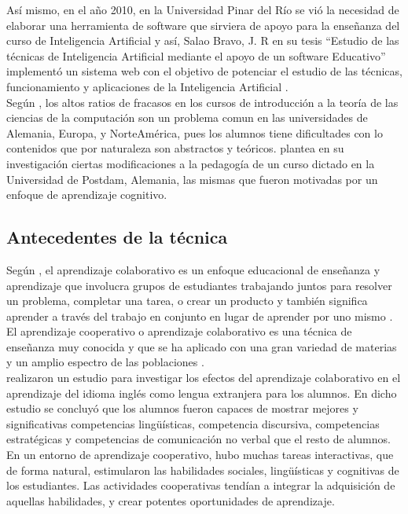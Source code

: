 Así mismo, en el año 2010, en la Universidad Pinar del Río se vió la necesidad de elaborar una herramienta de software que sirviera de apoyo para la enseñanza del curso de Inteligencia Artificial y así, Salao Bravo, J. R en su tesis “Estudio de las técnicas de Inteligencia Artificial mediante el apoyo de un software Educativo” implementó un sistema web con el objetivo de potenciar el estudio de las técnicas, funcionamiento y aplicaciones de la Inteligencia Artificial \cite{salao_bravo_estudio_2010}.\\

Según , los altos ratios de fracasos en los cursos de introducción a la teoría de las ciencias de la computación son un problema comun en las universidades de Alemania, Europa, y NorteAmérica, pues los alumnos tiene dificultades con lo contenidos que por naturaleza son abstractos y teóricos. \cite{knobelsdorf_teaching_2014} plantea en su investigación ciertas modificaciones a la pedagogía de un curso dictado en la Universidad de Postdam, Alemania, las mismas que fueron motivadas por un enfoque de aprendizaje cognitivo.

\subsection{Antecedentes de la técnica}

Según \cite{laal_collaborative_2012}, el aprendizaje colaborativo es un enfoque educacional de enseñanza y aprendizaje que involucra grupos de estudiantes trabajando juntos para resolver un problema, completar una tarea, o crear un producto y también significa aprender a través del trabajo en conjunto en lugar de aprender por uno mismo \cite{barkley_collaborative_2012}.\\

El aprendizaje cooperativo o aprendizaje colaborativo es una técnica de enseñanza muy conocida y que se ha aplicado con una gran variedad de materias y un amplio espectro de las poblaciones \cite{beck_experimental_2008}.\\

\cite{azizinezhad_application_2013} realizaron un estudio para investigar los efectos del aprendizaje colaborativo en el aprendizaje del idioma inglés como lengua extranjera para los alumnos. En dicho estudio se concluyó que los alumnos fueron capaces de mostrar mejores y significativas competencias lingüísticas, competencia discursiva, competencias estratégicas y competencias de comunicación no verbal que el resto de alumnos. En un entorno de aprendizaje cooperativo, hubo muchas tareas interactivas, que de forma natural, estimularon las habilidades sociales, lingüísticas y cognitivas de los estudiantes. Las actividades cooperativas tendían a integrar la adquisición de aquellas habilidades, y crear potentes oportunidades de aprendizaje.\\

